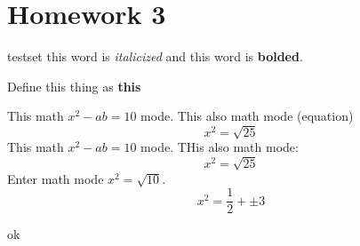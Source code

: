 \section{Homework 3} 
testset this word is \emph{italicized} and this word is \textbf{bolded}.
\begin{definition}[]
    Define this thing as \textbf{this} 
\end{definition}
This math $x^2-ab=10$ mode. This also math mode (equation) \[
    x^2=\sqrt{25} 
\]
This math $x^2-ab=10$ mode. THis also math mode: \[
x^2=\sqrt{25} 
\] Enter math mode $x^2=\sqrt{10} $. \[
x^2 = \frac{1}{2}+\pm 3
\] 
\begin{prob}
    ok
\end{prob}
